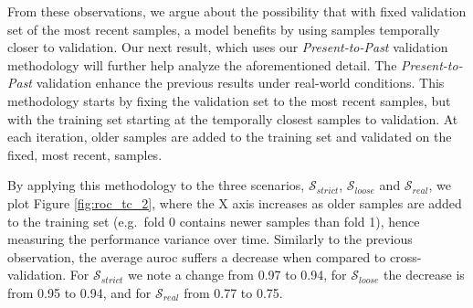 From these observations, we argue about the possibility that with fixed validation set of the most recent samples, a model benefits by using samples temporally closer to validation. Our next result, which uses our \textit{Present-to-Past} validation methodology will further help analyze the aforementioned detail. The \textit{Present-to-Past} validation enhance the previous results under real-world conditions. This methodology starts by fixing the validation set to the most recent samples, but with the training set starting at the temporally closest samples to validation. At each iteration, older samples are added to the training set and validated on the fixed, most recent, samples.

By applying this methodology to the three scenarios, $\mathcal{S}_{strict}$, $\mathcal{S}_{loose}$ and $\mathcal{S}_{real}$, we plot Figure \ref{fig:roc_tc_2}, where the X axis increases as older samples are added to the training set (e.g.\ fold 0 contains newer samples than fold 1), hence measuring the performance variance over time. Similarly to the previous observation, the average \gls{auroc} suffers a decrease when compared to cross-validation. For $\mathcal{S}_{strict}$ we note a change from 0.97 to 0.94, for $\mathcal{S}_{loose}$ the decrease is from 0.95 to 0.94, and for $\mathcal{S}_{real}$ from 0.77 to 0.75.





